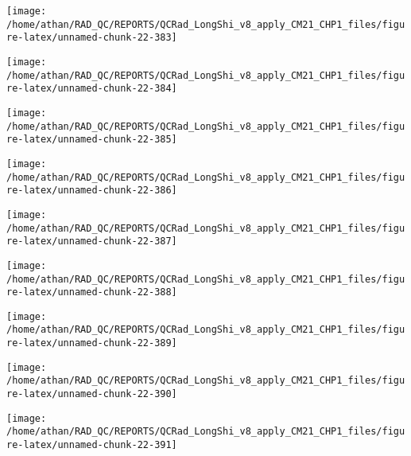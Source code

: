 \documentclass[
  10pt,
  a4paper,oneside]{article}
\begin{document}
\begin{center}\texttt{[image: /home/athan/RAD\_QC/REPORTS/QCRad\_LongShi\_v8\_apply\_CM21\_CHP1\_files/figure-latex/unnamed-chunk-22-383]} \end{center}

\begin{center}\texttt{[image: /home/athan/RAD\_QC/REPORTS/QCRad\_LongShi\_v8\_apply\_CM21\_CHP1\_files/figure-latex/unnamed-chunk-22-384]} \end{center}

\begin{center}\texttt{[image: /home/athan/RAD\_QC/REPORTS/QCRad\_LongShi\_v8\_apply\_CM21\_CHP1\_files/figure-latex/unnamed-chunk-22-385]} \end{center}

\begin{center}\texttt{[image: /home/athan/RAD\_QC/REPORTS/QCRad\_LongShi\_v8\_apply\_CM21\_CHP1\_files/figure-latex/unnamed-chunk-22-386]} \end{center}

\begin{center}\texttt{[image: /home/athan/RAD\_QC/REPORTS/QCRad\_LongShi\_v8\_apply\_CM21\_CHP1\_files/figure-latex/unnamed-chunk-22-387]} \end{center}

\begin{center}\texttt{[image: /home/athan/RAD\_QC/REPORTS/QCRad\_LongShi\_v8\_apply\_CM21\_CHP1\_files/figure-latex/unnamed-chunk-22-388]} \end{center}

\begin{center}\texttt{[image: /home/athan/RAD\_QC/REPORTS/QCRad\_LongShi\_v8\_apply\_CM21\_CHP1\_files/figure-latex/unnamed-chunk-22-389]} \end{center}

\begin{center}\texttt{[image: /home/athan/RAD\_QC/REPORTS/QCRad\_LongShi\_v8\_apply\_CM21\_CHP1\_files/figure-latex/unnamed-chunk-22-390]} \end{center}

\begin{center}\texttt{[image: /home/athan/RAD\_QC/REPORTS/QCRad\_LongShi\_v8\_apply\_CM21\_CHP1\_files/figure-latex/unnamed-chunk-22-391]} \end{center}
\end{document}
